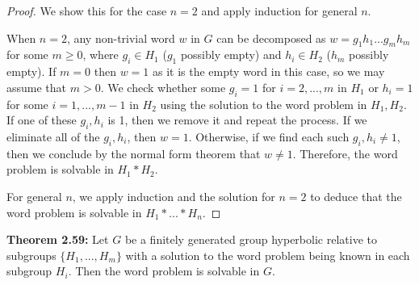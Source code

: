 \documentclass[12pt]{article}
\newcommand{\vs}{\vskip10pt}
\begin{document}
	\begin{proof}
		
	We show this for the case $n = 2$ and apply induction for general $n$. 
	
	\vs 
	
	When $n=2$, any non-trivial word $w$ in $G$ can be decomposed as $w = g_1 h_1 ... g_m h_m$ for some $m \geq 0$, where $g_i \in H_1$ ($g_1$ possibly empty) and $h_i \in H_2$ ($h_m$ possibly empty). If $m = 0$ then $w = 1$ as it is the empty word in this case, so we may assume that $m > 0$. We check whether some $g_i = 1$ for $i = 2,...,m$ in $H_1$ or $h_i = 1$ for some $i = 1,...,m-1$ in $H_2$ using the solution to the word problem in $H_1, H_2$. If one of these $g_i, h_i$ is 1, then we remove it and repeat the process. If we eliminate all of the $g_i, h_i$, then $w = 1$. Otherwise, if we find each such $g_i, h_i \neq 1$, then we conclude by the normal form theorem that $w \neq 1$. Therefore, the word problem is solvable in $H_1 * H_2$. 
	
	\vs 
	
	For general $n$, we apply induction and the solution for $n = 2$ to deduce that the word problem is solvable in $H_1 * ... * H_n$.
	
	\end{proof}
	
	\vs
	
	\textbf{Theorem 2.59: } Let $G$ be a finitely generated group hyperbolic relative to subgroups $\{H_1,...,H_m\}$ with a solution to the word problem being known in each subgroup $H_i$. Then the word problem is solvable in $G$. 
	
\end{document}
